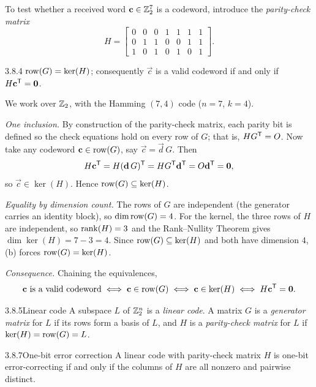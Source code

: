 To test whether a received word $\mathbf{c}\in\mathbb{Z}_2^7$ is a codeword, introduce the \emph{parity-check matrix}
\[
H=\begin{bmatrix}0&0&0&1&1&1&1\\0&1&1&0&0&1&1\\1&0&1&0&1&0&1\end{bmatrix}.
\]

\begin{thms}{3.8.4}{}
$\operatorname{row}(G)=\ker(H)$; consequently $\vec{c}$ is a valid codeword if and only if $H\mathbf{c}^{\mathsf{T}}=\mathbf{0}$.
\end{thms}

\begin{prf}
We work over $\mathbb{Z}_2$, with the Hamming $(7,4)$ code ($n=7$, $k=4$).

\emph{One inclusion.} By construction of the parity-check matrix, each parity bit is defined so the check equations hold on every row of $G$; that is, $HG^{\mathsf{T}}=O$. Now take any codeword $\mathbf{c}\in\operatorname{row}(G)$, say $\vec{c}=\vec{d}\,G$. Then
\[
H\mathbf{c}^{\mathsf{T}}=H(\mathbf{d}\,G)^{\mathsf{T}}=HG^{\mathsf{T}}\mathbf{d}^{\mathsf{T}}=O\mathbf{d}^{\mathsf{T}}=\mathbf{0},
\]
so $\vec{c}\in\ker(H)$. Hence $\operatorname{row}(G)\subseteq\ker(H)$.

\emph{Equality by dimension count.} The rows of $G$ are independent (the generator carries an identity block), so $\operatorname{dim}\operatorname{row}(G)=4$. For the kernel, the three rows of $H$ are independent, so $\operatorname{rank}(H)=3$ and the Rank--Nullity Theorem gives $\dim\ker(H)=7-3=4$. Since $\operatorname{row}(G)\subseteq\ker(H)$ and both have dimension $4$, (b) forces $\operatorname{row}(G)=\ker(H)$.

\emph{Consequence.} Chaining the equivalences,
\[
\mathbf{c}\text{ is a valid codeword}\iff\mathbf{c}\in\operatorname{row}(G)\iff\mathbf{c}\in\ker(H)\iff H\mathbf{c}^{\mathsf{T}}=\mathbf{0}.
\]
\end{prf}

\begin{defns}{3.8.5}{Linear code}
A subspace $L$ of $\mathbb{Z}_2^n$ is a \emph{linear code}. A matrix $G$ is a \emph{generator matrix} for $L$ if its rows form a basis of $L$, and $H$ is a \emph{parity-check matrix} for $L$ if $\ker(H)=\operatorname{row}(G)=L$.
\end{defns}

\begin{lems}{3.8.7}{One-bit error correction}
A linear code with parity-check matrix $H$ is one-bit error-correcting if and only if the columns of $H$ are all nonzero and pairwise distinct.
\end{lems}

